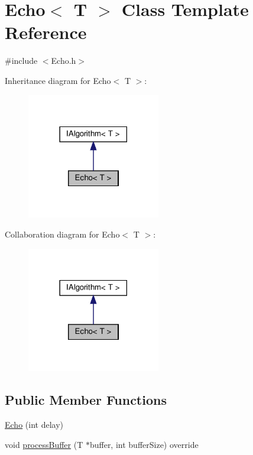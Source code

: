 \hypertarget{classEcho}{}\section{Echo$<$ T $>$ Class Template Reference}
\label{classEcho}


{\ttfamily \#include $<$Echo.\+h$>$}



Inheritance diagram for Echo$<$ T $>$\+:
\nopagebreak
\begin{figure}[H]
\begin{center}
\leavevmode
\includegraphics[width=165pt]{d1/dd3/classEcho__inherit__graph}
\end{center}
\end{figure}


Collaboration diagram for Echo$<$ T $>$\+:
\nopagebreak
\begin{figure}[H]
\begin{center}
\leavevmode
\includegraphics[width=165pt]{da/d44/classEcho__coll__graph}
\end{center}
\end{figure}
\subsection*{Public Member Functions}
\begin{DoxyCompactItemize}
\item 
\hyperlink{classEcho_af348cd7f23248e72046c5d006d3adca7}{Echo} (int delay)
\item 
void \hyperlink{classEcho_af5ea3baaa51600cf111f21f931895b46}{process\+Buffer} (T $\ast$buffer, int buffer\+Size) override
\end{DoxyCompactItemize}



